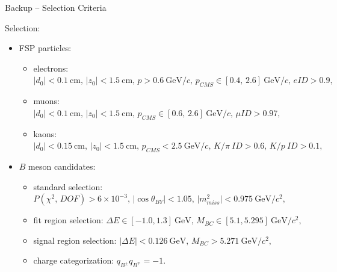 \documentclass[serif]{beamer}
\newcommand {\e}[1]{\mathrm{~#1}}
\newcommand {\E}[1]{\times 10^{#1}}
\begin{document}
\begin{frame}[t]{Backup -- Selection Criteria}

\vspace{-3mm}
\small

Selection:
\begin{itemize}
	\item FSP particles:
	\begin{itemize}
		\item electrons: $\vert d_0 \vert < 0.1\e{cm},\,\vert z_0 \vert < 1.5\e{cm},\,p>0.6\e{GeV}/c,\,p_{CMS}\in[0.4,\,2.6]\e{GeV}/c,\,eID>0.9,$
		\item muons: $\vert d_0 \vert < 0.1\e{cm},\,\vert z_0 \vert < 1.5\e{cm},\,p_{CMS}\in[0.6,\,2.6]\e{GeV}/c,\,\mu ID>0.97,$
		\item kaons: $\vert d_0 \vert < 0.15\e{cm},\,\vert z_0 \vert < 1.5\e{cm},\,p_{CMS} < 2.5\e{GeV}/c,\,K/\pi~ID>0.6,\,K/p~ID>0.1,$
	\end{itemize}
	\item $B$ meson candidates:
	\begin{itemize}
		\item standard selection: $P(\chi^2,\,DOF) > 6\E{-3},\,\vert \cos \theta_{BY} \vert < 1.05,\,\vert m_{miss}^2\vert<0.975\e{GeV}/c^2,$
		\item fit region selection: $\Delta E \in [-1.0,1.3]\e{GeV},\,M_{BC} \in [5.1,5.295]\e{GeV}/c^2,$
		\item signal region selection: $\vert \Delta E \vert < 0.126\e{GeV},\,M_{BC} > 5.271\e{GeV}/c^2,$
		\item charge categorization: $q_{B^\pm}q_{B^\mp} = -1.$
	\end{itemize}
\end{itemize}


\end{frame}
\end{document}
